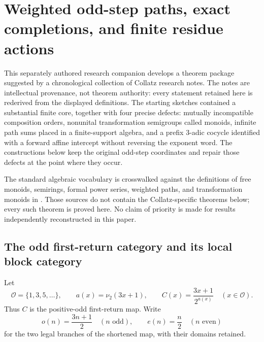 \section{Weighted odd-step paths, exact completions, and finite residue actions}
\label{sec:chatnotes-weighted-path-algebra}

This separately authored research companion develops a theorem package
suggested by a chronological collection of Collatz research notes.  The notes
are intellectual provenance, not theorem authority: every statement retained
here is rederived from the displayed definitions.  The starting sketches
contained a substantial finite core, together with four precise defects:
mutually incompatible composition orders, nonunital transformation
semigroups called monoids, infinite path sums placed in a finite-support
algebra, and a prefix $3$-adic cocycle identified with a forward affine
intercept without reversing the exponent word.  The constructions below keep
the original odd-step coordinates and repair those defects at the point where
they occur.

The standard algebraic vocabulary is crosswalked against the definitions of
free monoids, semirings, formal power series, weighted paths, and
transformation monoids in
\cite{KuichSalomaa1986,DrosteKuichVogler2009,Steinberg2016}.  Those sources do
not contain the Collatz-specific theorems below; every such theorem is proved
here.  No claim of priority is made for results independently reconstructed in
this paper.

\subsection{The odd first-return category and its local block category}

Let
\[
 \mathcal O=\{1,3,5,\ldots\},
 \qquad
 a(x)=\nu_2(3x+1),
 \qquad
 C(x)=\frac{3x+1}{2^{a(x)}}
 \quad(x\in\mathcal O).
\]
Thus $C$ is the positive-odd first-return map.  Write
\[
 o(n)=\frac{3n+1}{2}\quad(n\text{ odd}),
 \qquad
 e(n)=\frac n2\quad(n\text{ even})
\]
for the two legal branches of the shortened map, with their domains retained.

